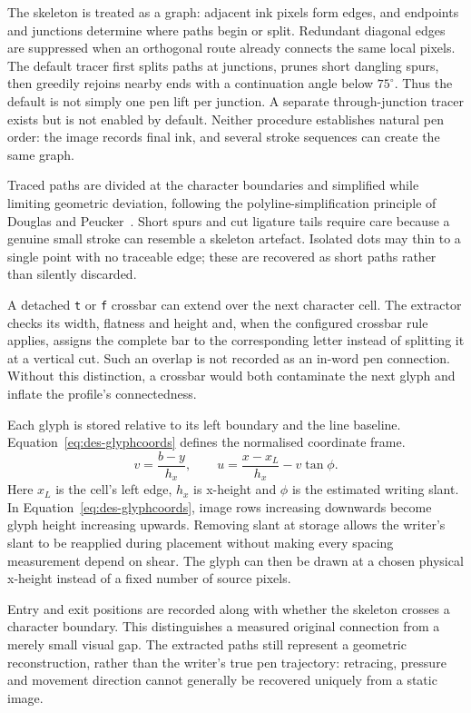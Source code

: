 The skeleton is treated as a graph: adjacent ink pixels form edges, and endpoints and junctions determine where paths begin or split. Redundant diagonal edges are suppressed when an orthogonal route already connects the same local pixels. The default tracer first splits paths at junctions, prunes short dangling spurs, then greedily rejoins nearby ends with a continuation angle below $75^\circ$. Thus the default is not simply one pen lift per junction. A separate through-junction tracer exists but is not enabled by default. Neither procedure establishes natural pen order: the image records final ink, and several stroke sequences can create the same graph.

Traced paths are divided at the character boundaries and simplified while limiting geometric deviation, following the polyline-simplification principle of Douglas and Peucker~\cite{douglas1973}. Short spurs and cut ligature tails require care because a genuine small stroke can resemble a skeleton artefact. Isolated dots may thin to a single point with no traceable edge; these are recovered as short paths rather than silently discarded.

A detached \texttt{t} or \texttt{f} crossbar can extend over the next character cell. The extractor checks its width, flatness and height and, when the configured crossbar rule applies, assigns the complete bar to the corresponding letter instead of splitting it at a vertical cut. Such an overlap is not recorded as an in-word pen connection. Without this distinction, a crossbar would both contaminate the next glyph and inflate the profile's connectedness.

Each glyph is stored relative to its left boundary and the line baseline. Equation~\ref{eq:des-glyphcoords} defines the normalised coordinate frame.
\begin{equation}
v=\frac{b-y}{h_x},\qquad
u=\frac{x-x_L}{h_x}-v\tan\phi.
\label{eq:des-glyphcoords}
\end{equation}
Here $x_L$ is the cell's left edge, $h_x$ is x-height and $\phi$ is the estimated writing slant. In Equation~\ref{eq:des-glyphcoords}, image rows increasing downwards become glyph height increasing upwards. Removing slant at storage allows the writer's slant to be reapplied during placement without making every spacing measurement depend on shear. The glyph can then be drawn at a chosen physical x-height instead of a fixed number of source pixels.

Entry and exit positions are recorded along with whether the skeleton crosses a character boundary. This distinguishes a measured original connection from a merely small visual gap. The extracted paths still represent a geometric reconstruction, rather than the writer's true pen trajectory: retracing, pressure and movement direction cannot generally be recovered uniquely from a static image.


